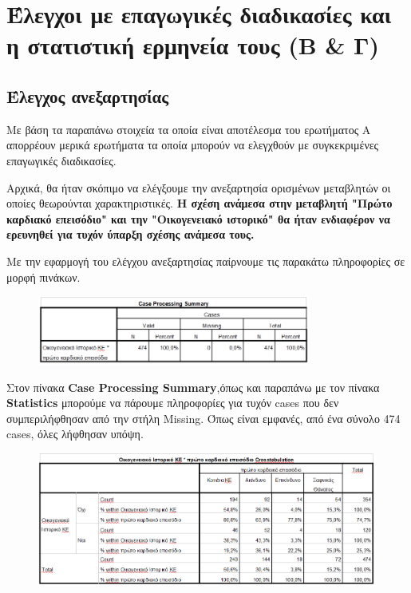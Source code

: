 \clearpage
\section{Έλεγχοι με επαγωγικές διαδικασίες και η στατιστική ερμηνεία τους (Β \& Γ)}

\subsection{Έλεγχος ανεξαρτησίας }
Με βάση τα παραπάνω στοιχεία τα οποία  είναι αποτέλεσμα του ερωτήματος Α απορρέουν μερικά ερωτήματα τα οποία μπορούν να ελεγχθούν με συγκεκριμένες επαγωγικές διαδικασίες.

Αρχικά, θα ήταν σκόπιμο να ελέγξουμε την ανεξαρτησία ορισμένων μεταβλητών οι οποίες θεωρούνται χαρακτηριστικές. \textbf{Η σχέση ανάμεσα στην μεταβλητή "Πρώτο καρδιακό επεισόδιο" και την "Οικογενειακό ιστορικό" θα ήταν ενδιαφέρον να ερευνηθεί για τυχόν ύπαρξη σχέσης ανάμεσα τους.}

Με την εφαρμογή του ελέγχου ανεξαρτησίας  παίρνουμε τις παρακάτω πληροφορίες σε μορφή πινάκων.

\begin{figure}[h]
    \centering
    \includegraphics[width=0.8\textwidth]{images/100.PNG}
\end{figure}

Στον πίνακα \textbf{Case Processing Summary},όπως και παραπάνω με τον πίνακα \textbf{Statistics} μπορούμε να πάρουμε πληροφορίες για τυχόν cases που δεν συμπεριλήφθησαν από την στήλη Missing. Όπως είναι εμφανές, από ένα σύνολο 474 cases, όλες λήφθησαν υπόψη.

\begin{figure}[h]
    \centering
    \includegraphics[width=\textwidth]{images/101.PNG}
\end{figure}

